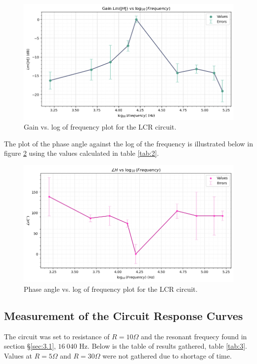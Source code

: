 \documentclass[12pt]{article}
\begin{document}
\begin{figure}[H]
    \centering
    \includegraphics[width=\textwidth]{plotlmhfreq.png}
    \caption{\centering Gain vs. log of frequency plot for the LCR circuit.}
    \label{fig:lmhfreq}
\end{figure}

The plot of the phase angle against the log of the frequency is illustrated below in figure \ref{fig:anglefreq} using the values calculated in table \ref{tab:2}.

\begin{figure}[H]
    \centering
    \includegraphics[width=\textwidth]{plotanglefrew.png}
    \caption{\centering Phase angle vs. log of frequency plot for the LCR circuit.}
    \label{fig:anglefreq}
\end{figure}

\subsection{Measurement of the Circuit Response Curves} \label{sec:3.3}

The circuit was set to resistance of $R = 10 \Omega$ and the resonant frequecy found in section §\ref{sec:3.1}, $16 \: 040$ Hz. Below is the table of results gathered, table \ref{tab:3}.
Values at $R= 5 \Omega$ and $R = 30 \Omega$ were not gathered due to shortage of time.
\end{document}
